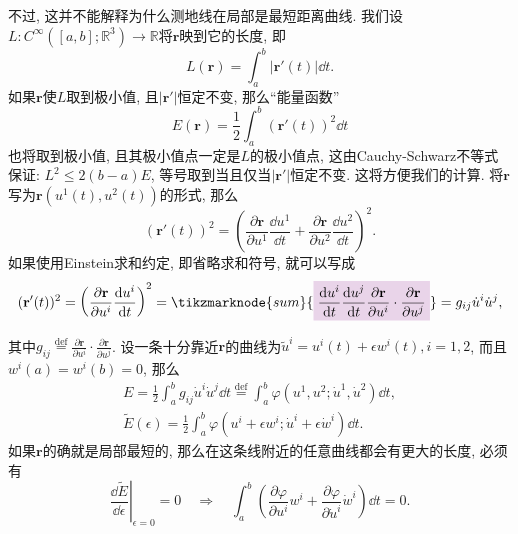 \documentclass[./main.tex]{subfiles}
\begin{document}
不过, 这并不能解释为什么测地线在局部是最短距离曲线. 我们设\(L:C^{\infty}([a,b];\mathbb{R}^3)\to\mathbb{R}\)将\(\mathbf{r}\)映到它的长度, 即
\[
    L(\mathbf{r})=\int_a^b|\mathbf{r}'(t)|\dd t.
\]
如果\(\mathbf{r}\)使\(L\)取到极小值, 且\(|\mathbf{r}'|\)恒定不变, 那么``能量函数''
\[
    E(\mathbf{r})=\frac{1}{2}\int_a^b(\mathbf{r}'(t))^2\dd t
\]
也将取到极小值, 且其极小值点一定是\(L\)的极小值点, 这由Cauchy-Schwarz不等式保证: \(L^2\le2(b-a)E\), 等号取到当且仅当\(|\mathbf{r}'|\)恒定不变. 这将方便我们的计算. 将\(\mathbf{r}\)写为\(\mathbf{r}(u^1(t),u^2(t))\)的形式, 那么
\[
    (\mathbf{r}'(t))^2=\left(\frac{\partial\mathbf{r}}{\partial u^1}\frac{\dd u^1}{\dd t}+\frac{\partial\mathbf{r}}{\partial u^2}\frac{\dd u^2}{\dd t}\right)^2.
\]
如果使用Einstein求和约定, 即省略求和符号, 就可以写成
\[
    (\mathbf{r}'(t))^2=\left(\frac{\partial\mathbf{r}}{\partial u^i}\frac{\dd u^i}{\dd t}\right)^2=\tikzmarknode{sum}{\highlight{violet}{\displaystyle\frac{\dd u^i}{\dd t}\frac{\dd u^j}{\dd t}\frac{\partial\mathbf{r}}{\partial u^i}\cdot\frac{\partial\mathbf{r}}{\partial u^j}}}=g_{ij}\dot{u}^i\dot{u}^j,
\]
其中\(g_{ij}\overset{\text{def}}{=}\frac{\partial\mathbf{r}}{\partial u^i}\cdot\frac{\partial\mathbf{r}}{\partial u^j}\). 设一条十分靠近\(\mathbf{r}\)的曲线为\(\tilde{u}^i=u^i(t)+\epsilon w^i(t),i=1,2\), 而且\(w^i(a)=w^i(b)=0\), 那么
\begin{gather}\label{equ:4}
    E=\frac12\int_a^bg_{ij}\dot{u}^i\dot{u}^j\dd t\overset{\text{def}}{=}\int_a^b\varphi(u^1,u^2;\dot u^1,\dot u^2)\dd t,\\
    \tilde{E}(\epsilon)=\frac12\int_a^b\varphi(u^i+\epsilon w^i;\dot u^i+\epsilon\dot w^i)\dd t.\nonumber
\end{gather}
如果\(\mathbf{r}\)的确就是局部最短的, 那么在这条线附近的任意曲线都会有更大的长度, 必须有
\[
    \left.\frac{\dd\tilde E}{\dd\epsilon}\right|_{\epsilon=0}=0\quad\Longrightarrow\quad\int_a^b\left(\frac{\partial\varphi}{\partial u^i}w^i+\frac{\partial\varphi}{\partial\dot u^i}\dot w^i\right)\dd t=0.
\]
\end{document}
